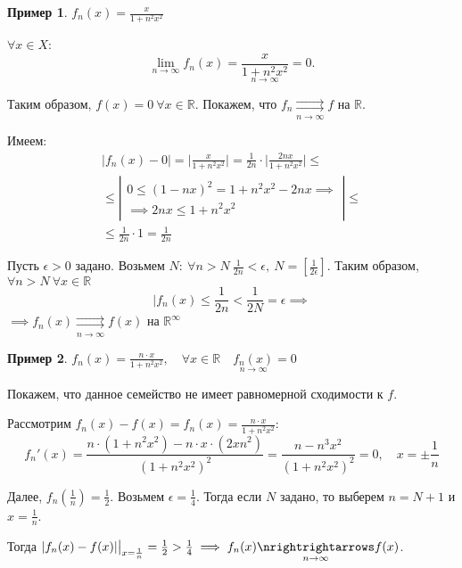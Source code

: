 \documentclass{report}
\theoremstyle{definition}
\newtheorem{example}{Пример}
\begin{document}
\begin{example}
  $f_n(x) = \frac{x}{1 + n^2x^2}$

  $\forall x \in X$:
  \begin{equation*}
    \underset{n\rightarrow\infty}{\lim}f_n(x) = \underset{n\rightarrow\infty}{\frac{x}{1 + n^2x^2}} = 0.
  \end{equation*}

  Таким образом, $f(x) = 0 \ \forall x \in \mathbb{R}$. Покажем, что $f_n \underset{n\rightarrow\infty}{\rightrightarrows}f$ на $\mathbb{R}$.

  Имеем:
  \begin{multline*}
    |f_n(x) - 0| = \bigg|\frac{x}{1 + n^2x^2}\bigg| = \frac{1}{2n} \cdot \bigg|\frac{2nx}{1 + n^2x^2}\bigg| \leqslant \\
    \leqslant\left|\begin{array}{l}
      0 \leqslant (1 - nx)^2 = 1 + n^2x^2 - 2nx \implies \\
      \implies 2nx \leqslant 1 + n^2x^2
    \end{array}\right| \leqslant \\
    \leqslant \frac{1}{2n}\cdot 1 = \frac{1}{2n}
  \end{multline*}

  Пусть $\epsilon > 0$ задано. Возьмем $N: \ \forall n > N \ \frac{1}{2n} < \epsilon, \ N = [\frac{1}{2\epsilon}]$. Таким образом, $\forall n > N \ \forall x \in \mathbb{R}$
  \begin{equation*}
    |f_n(x) \leqslant\frac{1}{2n} < \frac{1}{2N} = \epsilon \implies
  \end{equation*}
  $\implies f_n(x) \underset{n\rightarrow\infty}{\rightrightarrows} f(x)$ на $\mathbb{R}^\infty$
\end{example}

\begin{example}
  $f_n(x) = \frac{n\cdot x}{1 + n^2 x^2}, \quad \forall x \in \mathbb{R} \quad \underset{n\rightarrow\infty}{f_n(x)} = 0$

  Покажем, что данное семейство не имеет равномерной сходимости к $f$.

  Рассмотрим $f_n(x) - f(x) = f_n(x) = \frac{n\cdot x}{1 + n^2 x^2}$:
  \begin{equation*}
    f_n'(x) = \frac{n\cdot (1 + n^2 x^2) - n \cdot x \cdot (2xn^2)}{(1 + n^2 x^2)^2} = \frac{n - n^3x^2}{(1 + n^2x^2)^2} = 0, \quad x = \pm\frac{1}{n}
  \end{equation*}

  Далее, $f_n(\frac{1}{n}) = \frac{1}{2}$. Возьмем $\epsilon = \frac{1}{4}$. Тогда если $N$ задано, то выберем $n = N + 1$ и $x = \frac{1}{n}$.

  Тогда $|f_n(x) - f(x)| \big|_{x = \frac{1}{n}} = \frac{1}{2} > \frac{1}{4} \implies f_n(x) \underset{n\rightarrow\infty}{\nrightrightarrows}f(x)$.
\end{example}
\end{document}
